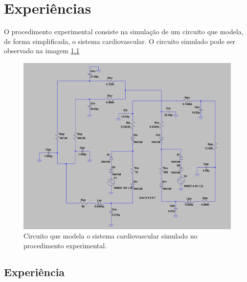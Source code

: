 \documentclass{abntex2}
\begin{document}
\imprimircapa
\imprimirfolhaderosto

\tableofcontents
\listoffigures
\clearpage

\chapter{Experiências}

O procedimento experimental consiste na simulação de um circuito que modela, de forma simplificada, o sistema cardiovascular. O circuito simulado pode ser observado na
imagem \ref{fig:circuitop}

\begin{figure}[h]
  \centering
  \includegraphics[scale = 0.5]{circuitop.png}
  \caption{Circuito que modela o sistema cardiovascular simulado no procedimento experimental.}
  \label{fig:circuitop}
\end{figure}


\section{Experiência}
\end{document}
